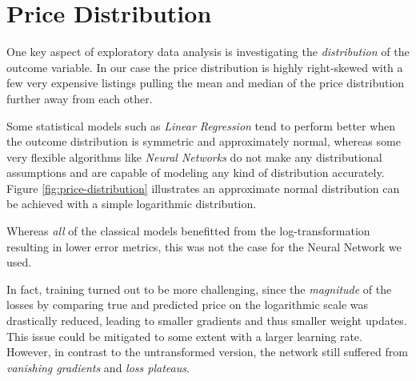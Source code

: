 \documentclass[12pt, letterpaper]{article}
\begin{document}


\section{Price Distribution}

One key aspect of exploratory data analysis is investigating the \emph{distribution} of the outcome variable.
In our case the price distribution is highly right-skewed with a few very expensive listings pulling the mean and median of the price distribution further away from each other.

Some statistical models such as \emph{Linear Regression} tend to perform better when the outcome distribution is symmetric and approximately normal, whereas some very flexible algorithms like \emph{Neural Networks} do not make any distributional assumptions and are capable of modeling any kind of distribution accurately.
Figure \ref{fig:price-distribution} illustrates an approximate normal distribution can be achieved with a simple logarithmic distribution.

Whereas \emph{all} of the classical models benefitted from the log-transformation resulting in lower error metrics, this was not the case for the Neural Network we used.

In fact, training turned out to be more challenging, since the \emph{magnitude} of the losses by comparing true and predicted price on the logarithmic scale was drastically reduced, leading to smaller gradients and thus smaller weight updates.
This issue could be mitigated to some extent with a larger learning rate.
However, in contrast to the untransformed version, the network still suffered from \emph{vanishing gradients} and \emph{loss plateaus}.
\end{document}

